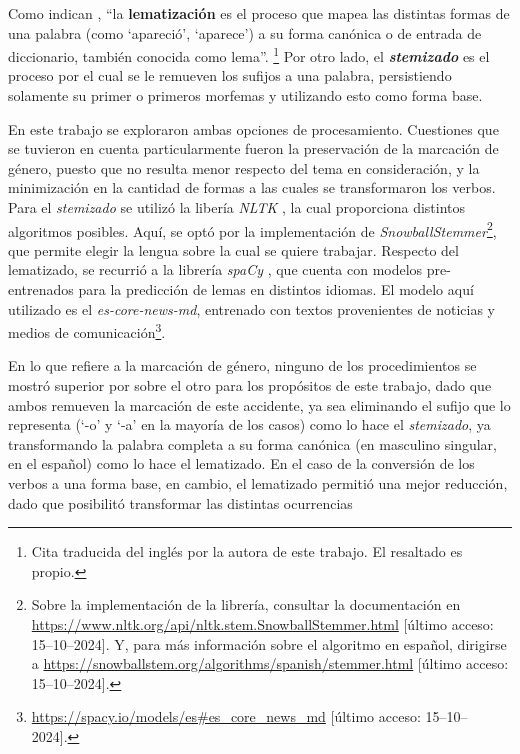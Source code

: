 Como indican \cite{bird2009natural}, ``la \textbf{lematizaci\'on} es el proceso que mapea
las distintas formas de una palabra (como `apareci\'o', `aparece') a su forma
can\'onica o de entrada de diccionario, tambi\'en conocida como lema''.
\footnote{Cita traducida del ingl\'es por la autora de este trabajo.
El resaltado es propio.}
Por otro lado, el
\textbf{\textit{stemizado}} es el proceso por el cual se le remueven los sufijos
a una palabra, persistiendo solamente su primer o primeros morfemas y utilizando
esto como forma base.
\par
En este trabajo se exploraron ambas opciones de procesamiento. Cuestiones que se tuvieron
en cuenta particularmente fueron la preservaci\'on de la marcaci\'on de g\'enero, puesto que
no resulta menor respecto del tema en consideraci\'on, y la minimizaci\'on en la cantidad de formas a las
cuales se transformaron los verbos. Para el \textit{stemizado} se utiliz\'o la
liber\'ia \textit{NLTK} \citep{bird2009natural},
la cual proporciona distintos algoritmos posibles. Aqu\'i, se opt\'o por la
implementaci\'on de \textit{SnowballStemmer}\footnote{Sobre la implementaci\'on de la
librer\'ia, consultar la documentaci\'on en
\url{https://www.nltk.org/api/nltk.stem.SnowballStemmer.html}
[\'ultimo acceso: 15--10--2024]. Y, para m\'as informaci\'on
sobre el algoritmo en español, dirigirse a
\url{https://snowballstem.org/algorithms/spanish/stemmer.html}
[\'ultimo acceso: 15--10--2024].}, que permite elegir
la lengua sobre la cual se quiere trabajar. Respecto del lematizado, se recurri\'o
a la librer\'ia \textit{spaCy} \citep{honnibal2020spacy}, que cuenta con modelos
pre-entrenados para la predicci\'on de lemas en distintos idiomas. El modelo aqu\'i
utilizado es el \textit{es-core-news-md}, entrenado con textos
provenientes de noticias y medios de
comunicaci\'on\footnote{\url{https://spacy.io/models/es\#es_core_news_md}
[\'ultimo acceso: 15--10--2024].}.
\par
En lo que refiere a la marcaci\'on de g\'enero, ninguno de los procedimientos se mostr\'o
superior por sobre el otro para los prop\'ositos de este trabajo, dado que ambos
remueven la marcaci\'on de este accidente, ya sea eliminando el sufijo que lo
representa (`-o' y `-a' en la mayor\'ia de los casos) como lo hace el
\textit{stemizado}, ya transformando la palabra completa a su forma can\'onica
(en masculino singular, en el español) como lo hace el lematizado. En el caso
de la conversi\'on de los verbos a una forma base, en cambio, el lematizado permiti\'o
una mejor reducci\'on, dado que posibilit\'o transformar las distintas ocurrencias
